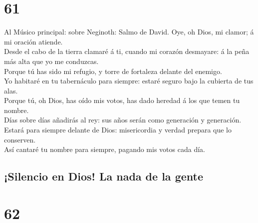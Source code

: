 \hypertarget{section-19-61}{%
\section{61}\label{section-19-61}}

 Al Músico principal: sobre Neginoth: Salmo de David. Oye,
oh Dios, mi clamor; á mi oración atiende.\\
 Desde el cabo de la tierra clamaré á ti, cuando mi
corazón desmayare: á la peña más alta que yo me conduzcas.\\
 Porque tú has sido mi refugio, y torre de fortaleza
delante del enemigo.\\
 Yo habitaré en tu tabernáculo para siempre: estaré seguro
bajo la cubierta de tus alas.\\
 Porque tú, oh Dios, has oído mis votos, has dado heredad
á los que temen tu nombre.\\
 Días sobre días añadirás al rey: sus años serán como
generación y generación.\\
 Estará para siempre delante de Dios: misericordia y
verdad prepara que lo conserven.\\
 Así cantaré tu nombre para siempre, pagando mis votos
cada día.

\hypertarget{silencio-en-dios-la-nada-de-la-gente}{%
\subsection{¡Silencio en Dios! La nada de la
gente}\label{silencio-en-dios-la-nada-de-la-gente}}

\hypertarget{section-19-62}{%
\section{62}\label{section-19-62}}

